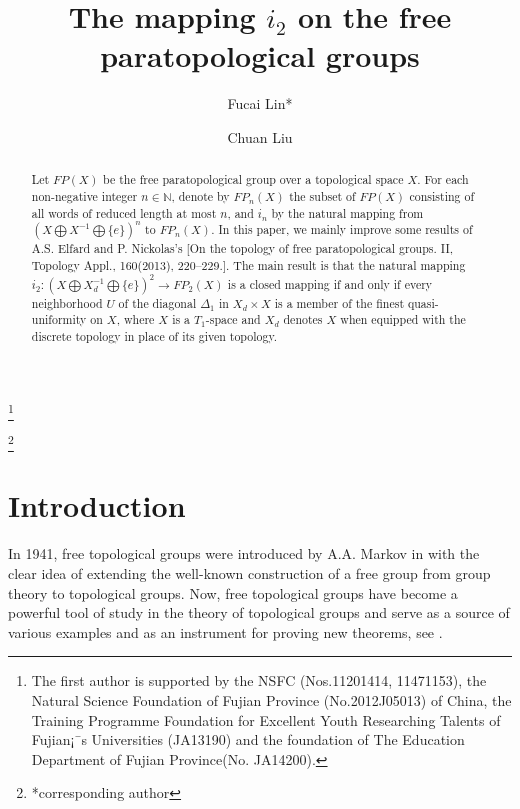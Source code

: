 \documentclass{amsart}
\theoremstyle{definition}
\begin{document}
\title[The mapping $i_{2}$ on the free paratopological groups]
{The mapping $i_{2}$ on the free paratopological groups}

\author{Fucai Lin*}
\address{(Fucai Lin): School of mathematics and statistics,
Minnan Normal University, Zhangzhou 363000, P. R. China}

\author{Chuan Liu}
\address{(Chuan Liu): Department of Mathematics,
Ohio University Zanesville Campus, Zanesville, OH 43701, USA}

\thanks{The first author is supported by the NSFC (Nos.11201414, 11471153), the Natural Science Foundation of Fujian Province (No.2012J05013) of China, the Training Programme Foundation for Excellent Youth Researching Talents of Fujian¡¯s Universities (JA13190) and the foundation of The Education Department of Fujian Province(No. JA14200).}

\thanks{*corresponding author}


\begin{abstract}
Let $FP(X)$ be the free paratopological group over a topological space $X$. For each non-negative integer $n\in\mathbb{N}$, denote by $FP_{n}(X)$ the subset of $FP(X)$ consisting of all words of reduced length at most $n$, and $i_{n}$ by the natural mapping from $(X\bigoplus X^{-1}\bigoplus\{e\})^{n}$ to $FP_{n}(X)$. In this paper, we mainly improve some results of A.S. Elfard and P. Nickolas's [On the topology of free paratopological groups. II, Topology Appl.,  160(2013), 220--229.]. The main result is that the natural mapping $i_{2}: (X\bigoplus X_{d}^{-1}\bigoplus\{e\})^{2}\longrightarrow FP_{2}(X)$ is a closed mapping
if and only if every neighborhood $U$ of the diagonal $\Delta_{1}$ in $X_{d}\times X$ is a member of the finest quasi-uniformity on $X$, where $X$ is a $T_{1}$-space and $X_{d}$ denotes $X$ when equipped with the discrete topology in place of its given topology.
\end{abstract}



\maketitle

\section{Introduction}
In 1941, free topological groups were introduced by A.A. Markov in \cite{MA} with the clear idea of extending the well-known construction of a free group from group theory to topological groups. Now, free topological groups have become a powerful tool of study in the theory of topological groups and serve as a source of various examples and as an instrument for proving new theorems, see \cite{AT2008}.
\end{document}
